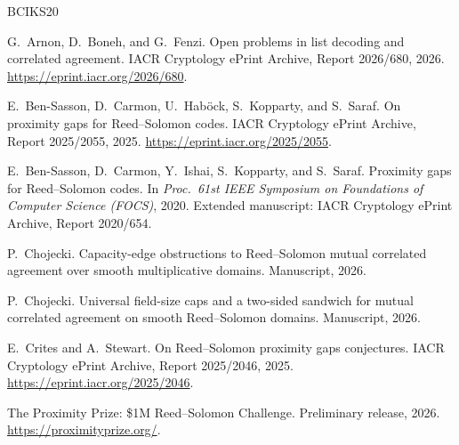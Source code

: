 \documentclass[11pt]{amsart}
\theoremstyle{definition}
\theoremstyle{remark}
\begin{document}
\medskip
\begin{thebibliography}{BCIKS20}

G.~Arnon, D.~Boneh, and G.~Fenzi.
\newblock Open problems in list decoding and correlated agreement.
\newblock IACR Cryptology ePrint Archive, Report 2026/680, 2026.
\newblock \url{https://eprint.iacr.org/2026/680}.

E.~Ben-Sasson, D.~Carmon, U.~Hab{\"o}ck, S.~Kopparty, and S.~Saraf.
\newblock On proximity gaps for Reed--Solomon codes.
\newblock IACR Cryptology ePrint Archive, Report 2025/2055, 2025.
\newblock \url{https://eprint.iacr.org/2025/2055}.

E.~Ben-Sasson, D.~Carmon, Y.~Ishai, S.~Kopparty, and S.~Saraf.
\newblock Proximity gaps for Reed--Solomon codes.
\newblock In \emph{Proc.\ 61st IEEE Symposium on Foundations of Computer Science (FOCS)}, 2020.
\newblock Extended manuscript: IACR Cryptology ePrint Archive, Report 2020/654.

P.~Chojecki.
\newblock Capacity-edge obstructions to Reed--Solomon mutual correlated agreement over smooth multiplicative domains.
\newblock Manuscript, 2026.

P.~Chojecki.
\newblock Universal field-size caps and a two-sided sandwich for mutual correlated agreement on smooth Reed--Solomon domains.
\newblock Manuscript, 2026.

E.~Crites and A.~Stewart.
\newblock On Reed--Solomon proximity gaps conjectures.
\newblock IACR Cryptology ePrint Archive, Report 2025/2046, 2025.
\newblock \url{https://eprint.iacr.org/2025/2046}.

The Proximity Prize: \$1M Reed--Solomon Challenge.
\newblock Preliminary release, 2026.
\newblock \url{https://proximityprize.org/}.

\end{thebibliography}
\end{document}

